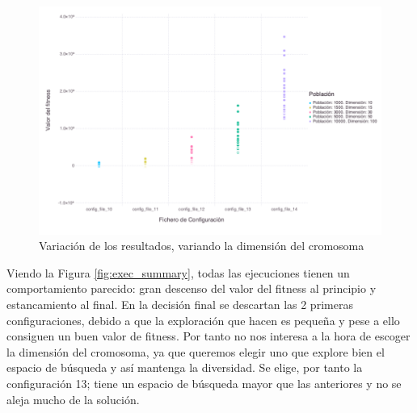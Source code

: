 \begin{figure}[]
	\centering	
	\includegraphics[scale=0.5]{figuras/ps_cd_point.png}
	\caption{ Variación de los resultados, variando la dimensión del cromosoma }
    \label{fig:box_plots_crom_dim}
\end{figure}

Viendo la Figura \ref{fig:exec_summary}, todas las ejecuciones tienen un comportamiento parecido: gran descenso del valor del fitness al principio y estancamiento al final. 
En la decisión final se descartan las 2 primeras configuraciones, debido a que la exploración que hacen es pequeña y pese a ello consiguen un buen valor de fitness. Por tanto
no nos interesa a la hora de escoger la dimensión del cromosoma, ya que queremos elegir uno que explore bien el espacio de búsqueda y así mantenga la diversidad. Se elige, por tanto la configuración 13; tiene un espacio de búsqueda mayor que las anteriores y no se aleja mucho de la solución.
